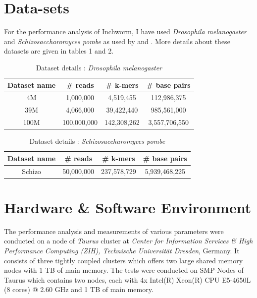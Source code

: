 \label{key}\documentclass[bachinf, english ,zihtitle,final,hyperref,utf8]{zihpub}
\begin{document}
\section{Data-sets}
For the performance analysis of Inchworm, I have used \emph{Drosophila melanogaster} and \emph{Schizosaccharomyces pombe} as used by \cite{zhao} and \cite{performance}. More details about these datasets are given in tables 1 and 2.\\
\begin{table}
\begin{center}
\begin{tabular}{| c | c | c | c |}        
\hline            
  Dataset name & \# reads & \# k-mers & \# base pairs \\	\hline
  4M & 1,000,000 & 4,519,455 & 112,986,375 \\  \hline
 39M & 4,066,000 & 39,422,440 & 985,561,000 \\ \hline
 100M & 100,000,000 & 142,308,262 & 3,557,706,550 \\
  \hline  
\end{tabular}
\end{center}
\caption{Dataset details : \emph{Drosophila melanogaster}}
\end{table}
\begin{table}
\begin{center}
\begin{tabular}{| c | c | c | c |}        
\hline            
  Dataset name & \# reads & \# k-mers & \# base pairs \\	\hline
  Schizo & 50,000,000 & 237,578,729 & 5,939,468,225 \\
  \hline  
\end{tabular}
\end{center}
\caption{Dataset details : \emph{Schizosaccharomyces pombe}}
\end{table}
\section{Hardware \& Software Environment}
The performance analysis and measurements of various parameters were conducted on a node of \emph{Taurus} cluster at \emph{Center for Information Services \& High Performance Computing (ZIH), Technische Universit{\"a}t Dresden}, Germany. It consists of three tightly coupled clusters which offers two large shared memory nodes with 1 TB of main memory. The tests were conducted on SMP-Nodes of Taurus which contains two nodes, each with 4x Intel(R) Xeon(R) CPU E5-4650L (8 cores) @ 2.60 GHz and 1 TB of main memory.
\end{document}
